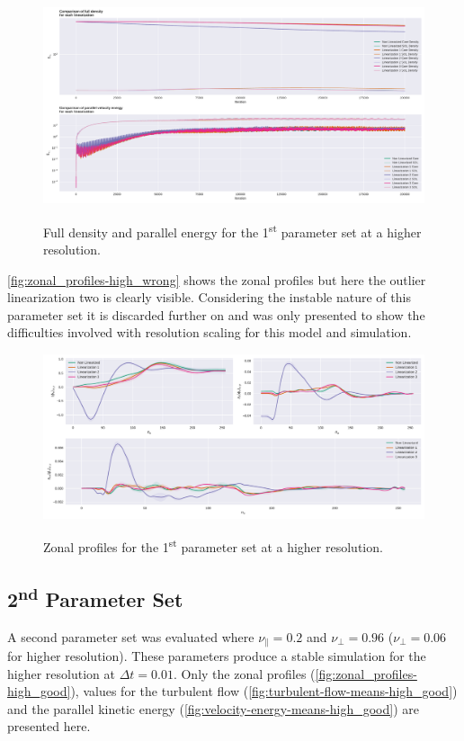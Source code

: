 \documentclass[master.tex]{subfiles}
\begin{document}
\begin{figure}[!hbtp]
    \includegraphics[width=\linewidth]{pdfs/0-11_0-001375/density_vs_velocity.pdf}
    \label{fig:density-velocity-high-wrong}
    \caption{Full density and parallel energy for the 1\textsuperscript{st} parameter set at a higher resolution.}
\end{figure}

\autoref{fig:zonal_profiles-high_wrong} shows the zonal profiles but here the outlier linearization two is clearly visible. Considering the instable nature of this parameter set it is discarded further on and was only presented to show the difficulties involved with resolution scaling for this model and simulation.

\begin{figure}[!hbtp]
    \includegraphics[width=\linewidth]{pdfs/0-11_0-001375/zonal_profiles.pdf}
    \label{fig:zonal_profiles-high_wrong}
    \caption{Zonal profiles for the 1\textsuperscript{st} parameter set at a higher resolution.}
\end{figure}

\subsection{2\textsuperscript{nd} Parameter Set}
A second parameter set was evaluated where $\nu_\parallel = 0.2$ and $\nu_\perp = 0.96$ ($\nu_\perp = 0.06$ for higher resolution). These parameters produce a stable simulation for the higher resolution at $\Delta t = 0.01$. Only the zonal profiles (\autoref{fig:zonal_profiles-high_good}), values for the turbulent flow (\autoref{fig:turbulent-flow-means-high_good}) and the parallel kinetic energy (\autoref{fig:velocity-energy-means-high_good}) are presented here. 
\end{document}
